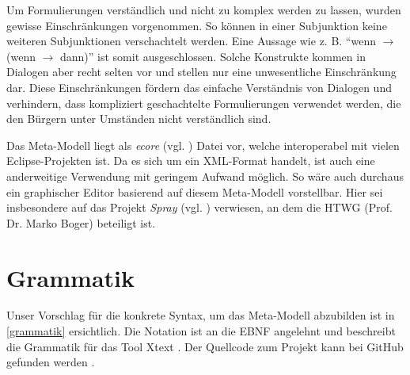 \documentclass[11pt,a4paper,bibtotocnumbered]{scrreprt}
\begin{document}
Um Formulierungen verständlich und nicht zu komplex werden zu lassen, wurden gewisse Einschränkungen vorgenommen. 
So können in einer Subjunktion keine weiteren Subjunktionen verschachtelt werden.
Eine Aussage wie z. B. \enquote{wenn $\rightarrow$ (wenn $\rightarrow$ dann)} ist somit ausgeschlossen.
Solche Konstrukte kommen in Dialogen aber recht selten vor und stellen nur eine unwesentliche Einschränkung dar.
Diese Einschränkungen fördern das einfache Verständnis von Dialogen und verhindern, dass kompliziert geschachtelte Formulierungen verwendet werden, die den Bürgern unter Umständen nicht verständlich sind.

Das Meta-Modell liegt als \emph{ecore} (vgl. \cite{Ecore}) Datei vor, welche interoperabel mit vielen Eclipse-Projekten ist. 
Da es sich um ein XML-Format handelt, ist auch eine anderweitige Verwendung mit geringem Aufwand möglich.
So wäre auch durchaus ein graphischer Editor basierend auf diesem Meta-Modell vorstellbar.
Hier sei insbesondere auf das Projekt \emph{Spray} (vgl. \cite{Spray}) verwiesen, an dem die HTWG (Prof. Dr. Marko Boger) beteiligt ist.

\section{Grammatik}

Unser Vorschlag für die konkrete Syntax, um das Meta-Modell abzubilden ist in \autoref{grammatik} ersichtlich.
Die Notation ist an die \ac{EBNF} angelehnt und beschreibt die Grammatik für das Tool Xtext \cite{Xtext}.
Der Quellcode zum Projekt kann bei GitHub gefunden werden \cite{GitHubCode}.
\end{document}
